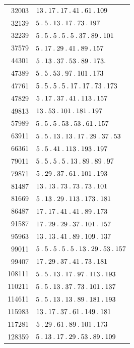 \begin{longtable}{@{}r|l@{}}
32003 & $13\pdot 17\pdot 17\pdot 41\pdot 61\pdot 109$\\
32139 & $5\pdot 5\pdot 13\pdot 17\pdot 73\pdot 197$\\
32239 & $5\pdot 5\pdot 5\pdot 5\pdot 5\pdot 37\pdot 89\pdot 101$\\
37579 & $5\pdot 17\pdot 29\pdot 41\pdot 89\pdot 157$\\
44301 & $5\pdot 13\pdot 37\pdot 53\pdot 89\pdot 173.$\\
47389 & $5\pdot 5\pdot 53\pdot 97\pdot 101\pdot 173$\\
47761 & $5\pdot 5\pdot 5\pdot 5\pdot 17\pdot 17\pdot 73\pdot 173$\\
47829 & $5\pdot 17\pdot 37\pdot 41\pdot 113\pdot 157$\\
49813 & $13\pdot 53\pdot 101\pdot 181\pdot 197$\\
57989 & $5\pdot 5\pdot 5\pdot 53\pdot 53\pdot 61\pdot 157$\\
63911 & $5\pdot 5\pdot 13\pdot 13\pdot 17\pdot 29\pdot 37\pdot 53$\\
66361 & $5\pdot 5\pdot 41\pdot 113\pdot 193\pdot 197$\\
79011 & $5\pdot 5\pdot 5\pdot 5\pdot 13\pdot 89\pdot 89\pdot 97$\\
79871 & $5\pdot 29\pdot 37\pdot 61\pdot 101\pdot 193$\\
81487 & $13\pdot 13\pdot 73\pdot 73\pdot 73\pdot 101$\\
81669 & $5\pdot 13\pdot 29\pdot 113\pdot 173\pdot 181$\\
86487 & $17\pdot 17\pdot 41\pdot 41\pdot 89\pdot 173$\\
91587 & $17\pdot 29\pdot 29\pdot 37\pdot 101\pdot 157$\\
95963 & $13\pdot 13\pdot 41\pdot 89\pdot 109\pdot 137$\\
99011 & $5\pdot 5\pdot 5\pdot 5\pdot 5\pdot 13\pdot 29\pdot 53\pdot 157$\\
99407 & $17\pdot 29\pdot 37\pdot 41\pdot 73\pdot 181$\\
108111 & $5\pdot 5\pdot 13\pdot 17\pdot 97\pdot 113\pdot 193$\\
110211 & $5\pdot 5\pdot 13\pdot 37\pdot 73\pdot 101\pdot 137$\\
114611 & $5\pdot 5\pdot 13\pdot 13\pdot 89\pdot 181\pdot 193$\\
115983 & $13\pdot 17\pdot 37\pdot 61\pdot 149\pdot 181$\\
117281 & $5\pdot 29\pdot 61\pdot 89\pdot 101\pdot 173$\\
128359 & $5\pdot 13\pdot 17\pdot 29\pdot 53\pdot 89\pdot 109$\\

\end{longtable}
